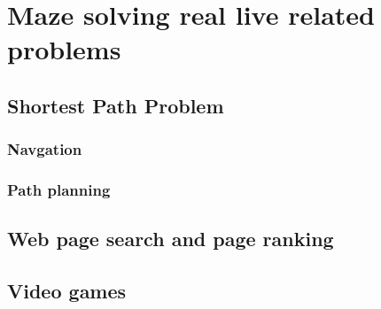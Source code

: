 \chapter{Maze solving real live related problems}\label{cha:background}
\section{Shortest Path Problem}
\subsection{Navgation}
\subsection{Path planning}
\section{Web page search and page ranking}
\section{Video games}